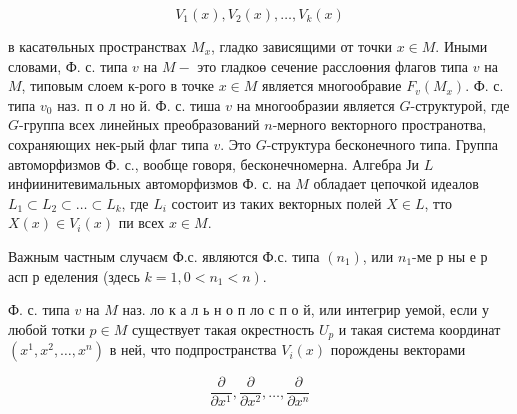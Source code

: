 \documentclass[10pt]{article}
\begin{document}
\[

V_{1}(x), V_{2}(x), \ldots, V_{k}(x)

\]



в касатөльных пространствах $M_{x}$, гладко зависящими от точки $x \in M$. Иными словами, Ф. с. типа $v$ на $M-$ это гладкоө сечение расслоөния флагов типа $v$ на $M$, типовым слоем к-рого в точке $x \in M$ является многообравие $F_{v}\left(M_{x}\right)$. Ф. с. типа $v_{0}$ наз. п о л но й. Ф. с. тиша $v$ на многообразии является $G$-структурой, где $G$-группа всех линейных преобразований $n$-мерного векторного пространотва, сохраняющих нек-рый флаг типа $v$. Это $G$-структура бесконечного типа. Группа автоморфизмов Ф. с., вообще говоря, бесконечномерна. Алгебра Ји $L$ инфиинитевимальных автоморфизмов Ф. с. на $M$ обладает цепочкой идеалов $L_{1} \subset L_{2} \subset \ldots \subset L_{k}$, где $L_{i}$ состоит из таких векторных полей $X \in L$, тто $X(x) \in V_{i}(x)$ пи всех $x \in M$.



Важным частным случаєм Ф.с. являются Ф.с. типа $\left(n_{1}\right)$, или $n_{1}$-ме р ны е р асп р еделения (здесь $\left.k=1,0<n_{1}<n\right)$.



Ф. с. типа $v$ на $M$ наз. ло к а л ь н о п ло с п о й, или интегрир уемой, если у любой тотки $p \in M$ существует такая окрестность $U_{p}$ и такая система координат $\left(x^{1}, x^{2}, \ldots, x^{n}\right)$ в ней, что подпространства $V_{i}(x)$ порождены векторами



\[

\frac{\partial}{\partial x^{1}}, \frac{\partial}{\partial x^{2}}, \ldots, \frac{\partial}{\partial x^{n}}

\]
\end{document}
